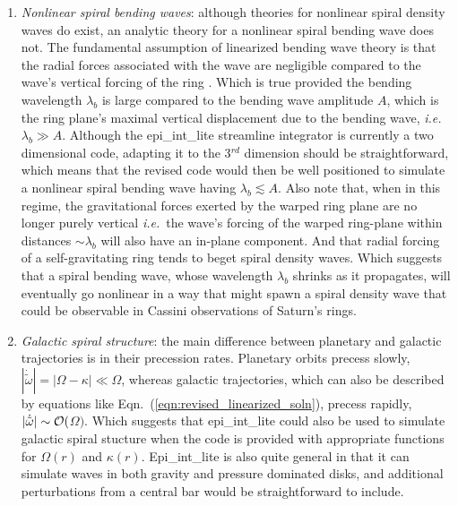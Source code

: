 \documentclass[preprint]{aastex62}
\begin{document}
\begin{enumerate}
\item {\it Nonlinear spiral bending waves}: although theories for nonlinear spiral density waves do exist, an
analytic theory for a nonlinear spiral bending wave does not. The fundamental assumption
of linearized bending wave theory is that the radial forces associated with the wave are negligible
compared to the wave's vertical forcing of the ring \citep{S84}. Which is true provided the bending wavelength
$\lambda_b$ is large compared to the bending wave amplitude $A$, which is the ring plane's maximal
vertical displacement due to the bending wave, {\it i.e.}\ $\lambda_b\gg A$.  
Although the epi\_int\_lite streamline integrator is 
currently a two dimensional code, adapting it to the 3$^{rd}$ dimension should be straightforward,
which means that the revised code would then be well positioned to simulate a nonlinear spiral bending wave having
$\lambda_b\lesssim A$. Also note that, when in this regime, the gravitational forces exerted by the
warped ring plane are no longer purely vertical {\it i.e.}\ the wave's forcing of the warped ring-plane
within distances $\sim\lambda_b$ will also have an in-plane component. And that radial forcing of a
self-gravitating ring tends to beget spiral density waves. Which suggests that
a spiral bending wave, whose wavelength $\lambda_b$ shrinks as it propagates, will
eventually go nonlinear in a way that might spawn a spiral density wave
that could be observable in Cassini observations of Saturn's rings.

\item {\it Galactic spiral structure}: the main difference between planetary and galactic trajectories
is in their precession rates. Planetary orbits precess slowly, 
$|\dot{\tilde{\omega}}|=|\Omega-\kappa|\ll\Omega$, whereas galactic trajectories,
which can also be described by equations like Eqn.\ (\ref{eqn:revised_linearized_soln}),
precess rapidly, $|\dot{\tilde{\omega}}|\sim\cal{O}($$\Omega)$. Which suggests
that epi\_int\_lite could also be used to simulate galactic spiral stucture
when the code is provided with appropriate functions for $\Omega(r)$ and $\kappa(r)$.
Epi\_int\_lite is also quite general in that it can simulate waves in both 
gravity and pressure dominated disks, and
additional perturbations from a central bar would be straightforward to include.


\end{enumerate}
\end{document}
